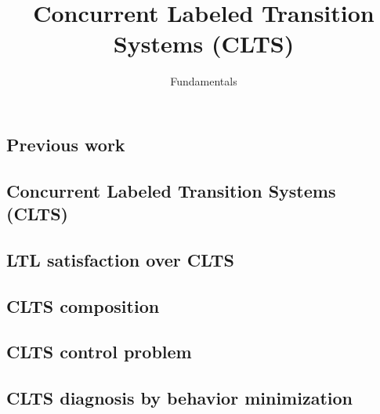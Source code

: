 \documentclass{article}
\title{Concurrent Labeled Transition Systems (CLTS)} %
\author{Fundamentals} %
\date{}
\begin{document}
\maketitle

\setcounter{section}{1} %
\setcounter{theorem}{1} %

\subsection{Previous work}


\subsection{Concurrent Labeled Transition Systems (CLTS)}


\subsection{LTL satisfaction over CLTS}


%

%

\subsection{CLTS composition}


\subsection{CLTS control problem}


\subsection{CLTS diagnosis by behavior minimization}

\end{document}
